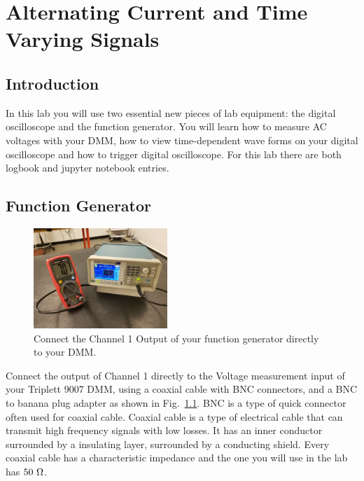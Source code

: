 \chapter{Alternating Current and Time Varying Signals}

\section{Introduction}

In this lab you will use two essential new pieces of lab equipment:
the digital oscilloscope and the function generator.  You will learn
how to measure AC voltages with your DMM, how to view
time-dependent wave forms on your digital oscilloscope and how to trigger digital oscilloscope. For this lab there are both logbook and jupyter notebook entries.


\section{Function Generator}

\begin{figure}[htbp]
\begin{center}
\includegraphics[width=0.45\textwidth]{figs/labs/lissajous/generator_dmm_setup.jpg} 
\caption{Connect the Channel 1 Output of your function generator directly to your DMM.}
\label{fig:dmm_setup}
\end{center}
\end{figure}

 Connect the output of Channel 1 directly to the Voltage measurement
input of your Triplett 9007 DMM, using a coaxial cable with BNC connectors, and a BNC to banana plug adapter as
shown in Fig.~\ref{fig:dmm_setup}.  BNC is a type of quick connector often used for coaxial cable.  Coaxial cable is a type of electrical cable that can transmit high frequency signals with low losses. It has an inner conductor surrounded by a insulating layer, surrounded by a conducting shield. Every coaxial cable has a characteristic impedance and the one you will use in the lab has $50~\rm \Omega$. 

